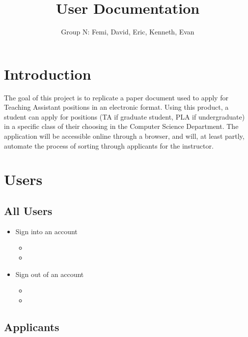 \documentclass[11pt]{amsart}
\title{User Documentation}
\author{Group N: Femi, David, Eric, Kenneth, Evan}
\begin{document}
\maketitle
\section{Introduction}
\noindent The goal of this project is to replicate a paper document used to apply for Teaching Assistant positions in an electronic format. Using this product, a student can apply for positions (TA if graduate student, PLA if undergraduate) in a specific class of their choosing in the Computer Science Department. The application will be accessible online through a browser, and will, at least partly, automate the process of sorting through applicants for the instructor.
\section{Users}


\subsection{All Users}

\begin{itemize}
	\item{Sign into an account}
	\begin{itemize}
		\item{}
		\item{}
	\end{itemize}
	\item{Sign out of an account}
	\begin{itemize}
		\item{}
		\item{}
	\end{itemize}
\end{itemize}

\subsection{Applicants}
\end{document}
